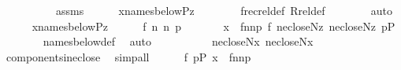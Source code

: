 \begin{isabellebody}
\ {\isacharminus}{\kern0pt}\isanewline
\ \ \isacommand{{\isacharbraceleft}{\kern0pt}}\isamarkupfalse%
\isanewline
\ \ \ \ \isamarkupfalse%
\ assms\isanewline
\ \ \ \ \isamarkupfalse%
\ {\isachardoublequoteopen}x{\isasymin}names{\isacharunderscore}{\kern0pt}below{\isacharparenleft}{\kern0pt}P{\isacharcomma}{\kern0pt}z{\isacharparenright}{\kern0pt}{\isachardoublequoteclose}\isanewline
\ \ \ \ \ \ \isamarkupfalse%
\ frecrel{\isacharunderscore}{\kern0pt}def\ Rrel{\isacharunderscore}{\kern0pt}def\isanewline
\ \ \ \ \ \ \isamarkupfalse%
\ auto\isanewline
\ \ \ \ \isamarkupfalse%
\ {\isacartoucheopen}x{\isasymin}names{\isacharunderscore}{\kern0pt}below{\isacharparenleft}{\kern0pt}P{\isacharcomma}{\kern0pt}z{\isacharparenright}{\kern0pt}{\isacartoucheclose}\isanewline
\ \ \ \ \isamarkupfalse%
\ f\ n{}\ n{}\ p\ \isanewline
\ \ \ \ \ \ {\isachardoublequoteopen}x\ {\isacharequal}{\kern0pt}\ {\isasymlangle}f{\isacharcomma}{\kern0pt}n{}{\isacharcomma}{\kern0pt}n{}{\isacharcomma}{\kern0pt}p{\isasymrangle}{\isachardoublequoteclose}\ {\isachardoublequoteopen}f{\isasymin}{}{\isachardoublequoteclose}\ {\isachardoublequoteopen}n{}{\isasymin}ecloseN{\isacharparenleft}{\kern0pt}z{\isacharparenright}{\kern0pt}{\isachardoublequoteclose}\ {\isachardoublequoteopen}n{}{\isasymin}ecloseN{\isacharparenleft}{\kern0pt}z{\isacharparenright}{\kern0pt}{\isachardoublequoteclose}\ {\isachardoublequoteopen}p{\isasymin}P{\isachardoublequoteclose}\isanewline
\ \ \ \ \ \ \isamarkupfalse%
\ names{\isacharunderscore}{\kern0pt}below{\isacharunderscore}{\kern0pt}def\ \isamarkupfalse%
\ auto\isanewline
\ \ \ \ \isamarkupfalse%
\isanewline
\ \ \ \ \isamarkupfalse%
\ {\isachardoublequoteopen}n{}{\isasymin}ecloseN{\isacharparenleft}{\kern0pt}x{\isacharparenright}{\kern0pt}{\isachardoublequoteclose}\ {\isachardoublequoteopen}n{}{\isasymin}ecloseN{\isacharparenleft}{\kern0pt}x{\isacharparenright}{\kern0pt}{\isachardoublequoteclose}\isanewline
\ \ \ \ \ \ \isamarkupfalse%
\ components{\isacharunderscore}{\kern0pt}in{\isacharunderscore}{\kern0pt}eclose\ \isamarkupfalse%
\ simp{\isacharunderscore}{\kern0pt}all\isanewline
\ \ \ \ \isamarkupfalse%
\ {\isacartoucheopen}f{\isasymin}{}{\isacartoucheclose}\ {\isacartoucheopen}p{\isasymin}P{\isacartoucheclose}\ {\isacartoucheopen}x\ {\isacharequal}{\kern0pt}\ {\isasymlangle}f{\isacharcomma}{\kern0pt}n{}{\isacharcomma}{\kern0pt}n{}{\isacharcomma}{\kern0pt}p{\isasymrangle}{\isacartoucheclose}\isanewline

\end{isabellebody}
